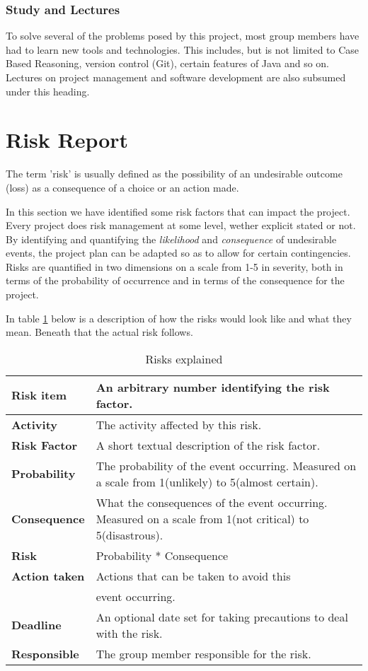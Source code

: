 \subsubsection{Study and Lectures}
To solve several of the problems posed by this project, most group members have had to learn new tools and technologies. This includes, but is not limited to Case Based Reasoning, version control (Git), certain features of Java and so on. Lectures on project management  and software development are also subsumed under this heading.

\section{Risk Report}\label{riskReport}
The term 'risk' is usually defined as the possibility of an undesirable outcome (loss) as a consequence of a choice or an action made. 

In this section we have identified some risk factors that can impact the project. Every project does risk management at some level, wether explicit stated or not. By identifying and quantifying the \emph{likelihood} and \emph{consequence} of undesirable events, the project plan can be adapted so as to allow for certain contingencies. Risks are quantified in two dimensions on a scale from 1-5 in severity, both in terms of the probability of occurrence and in terms of the consequence for the project.

In table \ref{riskTable} below is a description of how the risks would look like and what they mean. Beneath that the actual risk follows.


\begin{table}[htdp]
\caption{Risks explained}
\begin{center}
\begin{tabularx}{\textwidth}{| X | X |}
\hline
\textbf{Risk item} & An arbitrary number identifying the risk factor. \\
\hline
\textbf{Activity} & The activity affected by this risk. \\
\hline
\textbf{Risk Factor} & A short textual description of the risk factor. \\
\hline
\textbf{Probability} & The probability of the event occurring. Measured on a scale from 1(unlikely) to 5(almost certain).\\
\hline
\textbf{Consequence} & What the consequences of the event occurring. Measured on a scale from 1(not critical) to 5(disastrous).\\
\hline
\textbf{Risk} & Probability * Consequence\\
\hline
\textbf{Action taken} & Actions that can be taken to avoid this\\ & event occurring. \\
\hline
\textbf{Deadline} & An optional date set for taking precautions to deal with the risk. \\
\hline
\textbf{Responsible} & The group member responsible for the risk. \\
\hline
\end{tabularx}
\end{center}
\label{riskTable}
\end{table}

